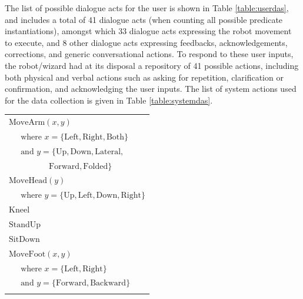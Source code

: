 The list of possible dialogue acts for the user is shown in Table \ref{table:userdas}, and includes a total of 41 dialogue acts (when counting all possible predicate instantiations), amongst which 33 dialogue acts expressing the robot movement to execute, and 8 other dialogue acts expressing feedbacks, acknowledgements, corrections, and generic conversational actions.  To respond to these user inputs, the robot/wizard had at its disposal a repository of 41 possible actions, including both physical and verbal actions such as asking for repetition, clarification or confirmation, and acknowledging the user inputs.  The list of system actions used for the data collection is given in Table \ref{table:systemdas}. 

\renewcommand{\arraystretch}{1.1}

\begin{table}[h]
\begin{minipage}[b]{80mm}
\begin{footnotesize}
\begin{tabular}{p{60mm}} \hdashline \vspace{-2.5mm} 
$\mathrm{MoveArm}(x,y) $ \\ $ \ \ \ \ \ \text{ where } x=\{\mathrm{Left,Right,Both}\} $ \\ $ \ \ \ \ \  \text{ and } y = \{\mathrm{Up,Down,Lateral,}$ \\ $\ \ \ \ \ \ \ \ \ \  \ \ \ \ \ \ \ \ \ \ \ \ \mathrm{Forward,Folded}\}$ \\[0.5mm] \hdashline \vspace{-2.5mm} 
$\mathrm{MoveHead}(y) $ \\ $\ \ \ \ \  \text{ where } y = \{\mathrm{Up,Left,Down,Right}\}$ \\[0.5mm] \hdashline \vspace{-2.5mm} 
$\mathrm{Kneel}$ \\[0.5mm] \hdashline \vspace{-2.5mm}  
$\mathrm{StandUp}$ \\[0.5mm] \hdashline \vspace{-2.5mm} 
$\mathrm{SitDown}$ \\[0.5mm] \hdashline \vspace{-2.5mm} 
$\mathrm{MoveFoot}(x,y) $ \\ $\ \ \ \ \  \text{ where } x = \{\mathrm{Left,Right}\} $ \\ $\ \ \ \ \ \text{ and } y = \{\mathrm{Forward,Backward}\}$ \\[0.5mm] \hdashline \vspace{-2.5mm} 

\end{tabular}
\end{footnotesize}
\end{minipage}
\end{table}
